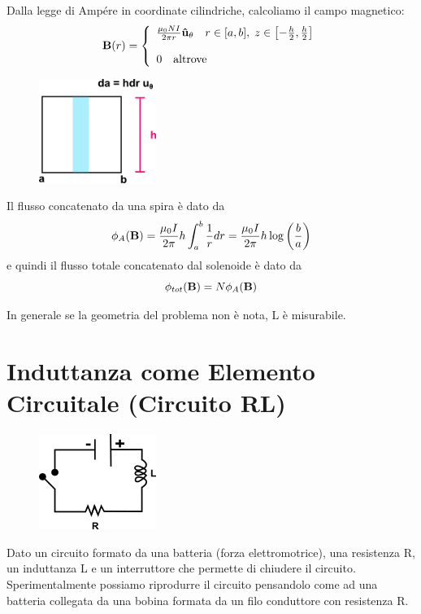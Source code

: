 	Dalla legge di Amp\'ere in coordinate cilindriche, calcoliamo il campo magnetico:
	\begin{align*}
		\bold{B}(r) = \left \{ \begin{array}{l}
			\frac{\mu_0 N I}{2 \pi r}\bold{\hat{u}}_{\theta} \quad r \in [a,b], \; z\in \left[-\frac{h}{2},\frac{h}{2} \right] \\ \rule{0pt}{20pt}
			0 \quad \text{altrove}
		\end{array}\right.
	\end{align*}
	\begin{figure} %
	\vspace{-1.2cm}
    \centering
    \includegraphics[width=0.34\textwidth]{images/integration_path} %
\end{figure}

Il flusso concatenato da una spira \`e dato da 
\begin{equation*}
	\phi_{A}(\bold{B}) = \frac{\mu_0I}{2 \pi}h \int_{a}^{b} \frac{1}{r}dr = \frac{\mu_0  I}{2 \pi}h \log\left(\frac{b}{a}\right)
\end{equation*}	
e quindi il flusso totale concatenato dal solenoide \`e dato da 
\begin{equation*}
	\phi_{tot}(\bold{B}) = N \phi_{A}(\bold{B})
\end{equation*}


In generale se la geometria del problema non \`e nota, L \`e misurabile.

\section{Induttanza come Elemento Circuitale (Circuito RL)}

	\begin{figure} %
    \centering
    \includegraphics[width=0.34\textwidth]{images/RL_circuit} %
\end{figure}
Dato un circuito formato da una batteria (forza elettromotrice), una resistenza R, un induttanza L e un interruttore che permette di chiudere il circuito. Sperimentalmente possiamo riprodurre il circuito pensandolo come ad una batteria collegata da una bobina formata da un filo conduttore con resistenza R.
\newline

